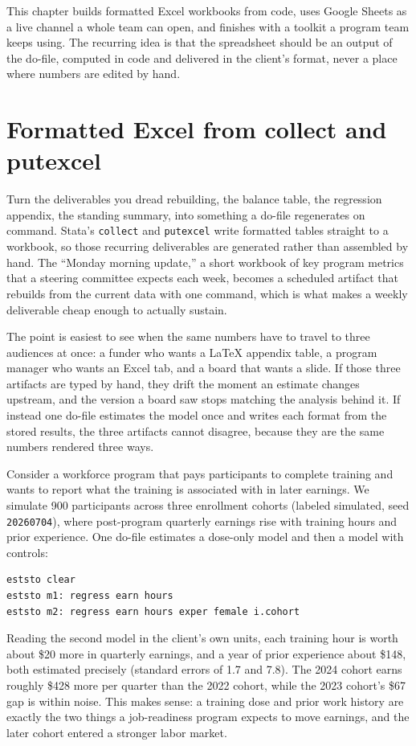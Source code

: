 \documentclass[
    a4paper,
    fontsize=10pt,
    twoside=true,
    numbers=noenddot,
]{kaobook}
\begin{document}
This chapter builds formatted Excel workbooks from code, uses Google Sheets as a live channel a whole team can open, and finishes with a toolkit a program team keeps using. The recurring idea is that the spreadsheet should be an output of the do-file, computed in code and delivered in the client's format, never a place where numbers are edited by hand.

\section{Formatted Excel from collect and putexcel}
Turn the deliverables you dread rebuilding, the balance table, the regression appendix, the standing summary, into something a do-file regenerates on command. Stata's \texttt{collect} and \texttt{putexcel} write formatted tables straight to a workbook, so those recurring deliverables are generated rather than assembled by hand. The \enquote{Monday morning update,} a short workbook of key program metrics that a steering committee expects each week, becomes a scheduled artifact that rebuilds from the current data with one command, which is what makes a weekly deliverable cheap enough to actually sustain.

The point is easiest to see when the same numbers have to travel to three audiences at once: a funder who wants a \LaTeX{} appendix table, a program manager who wants an Excel tab, and a board that wants a slide. If those three artifacts are typed by hand, they drift the moment an estimate changes upstream, and the version a board saw stops matching the analysis behind it. If instead one do-file estimates the model once and writes each format from the stored results, the three artifacts cannot disagree, because they are the same numbers rendered three ways.

Consider a workforce program that pays participants to complete training and wants to report what the training is associated with in later earnings. We simulate 900 participants across three enrollment cohorts (labeled simulated, seed \texttt{20260704}), where post-program quarterly earnings rise with training hours and prior experience. One do-file estimates a dose-only model and then a model with controls:
{\footnotesize
\begin{verbatim}
eststo clear
eststo m1: regress earn hours
eststo m2: regress earn hours exper female i.cohort
\end{verbatim}
}
Reading the second model in the client's own units, each training hour is worth about \$20 more in quarterly earnings, and a year of prior experience about \$148, both estimated precisely (standard errors of 1.7 and 7.8). The 2024 cohort earns roughly \$428 more per quarter than the 2022 cohort, while the 2023 cohort's \$67 gap is within noise. This makes sense: a training dose and prior work history are exactly the two things a job-readiness program expects to move earnings, and the later cohort entered a stronger labor market.
\end{document}
